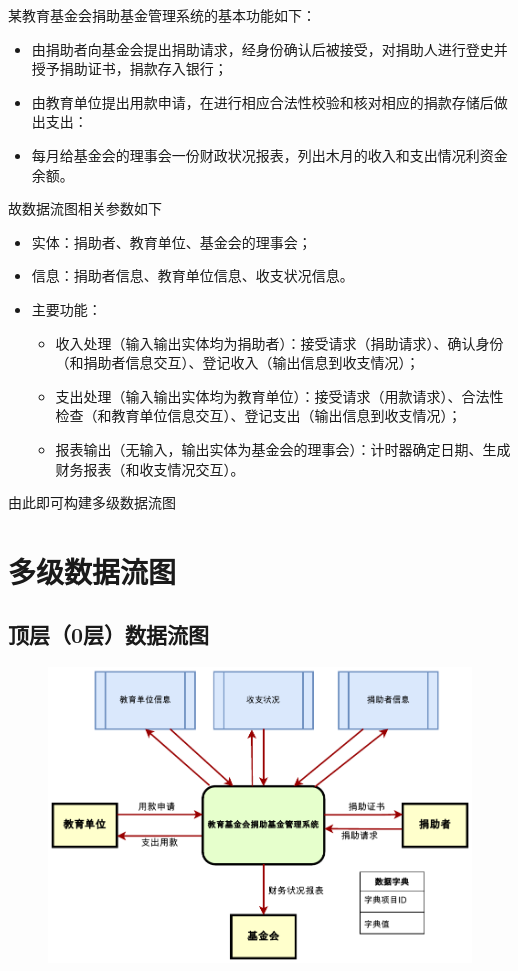 \documentclass[12pt, a4paper, oneside]{ctexart}
\begin{document}
某教育基金会捐助基金管理系统的基本功能如下：
\begin{itemize}
    \item 由捐助者向基金会提出捐助请求，经身份确认后被接受，对捐助人进行登史并授予捐助证书，捐款存入银行；
    \item 由教育单位提出用款申请，在进行相应合法性校验和核对相应的捐款存储后做出支出：
    \item 每月给基金会的理事会一份财政状况报表，列出木月的收入和支出情况利资金余额。
\end{itemize}

故数据流图相关参数如下
\begin{itemize}
    \item 实体：捐助者、教育单位、基金会的理事会；
    \item 信息：捐助者信息、教育单位信息、收支状况信息。
    \item 主要功能：
    \begin{itemize}
        \item 收入处理（输入输出实体均为捐助者）：接受请求（捐助请求）、确认身份（和捐助者信息交互）、登记收入（输出信息到收支情况）；
        \item 支出处理（输入输出实体均为教育单位）：接受请求（用款请求）、合法性检查（和教育单位信息交互）、登记支出（输出信息到收支情况）；
        \item 报表输出（无输入，输出实体为基金会的理事会）：计时器确定日期、生成财务报表（和收支情况交互）。
    \end{itemize}
\end{itemize}

由此即可构建多级数据流图

\section{多级数据流图}

\subsection{顶层（0层）数据流图}

\begin{figure}[H]
    \centering
    \includegraphics[width = 1\textwidth]{../pic/顶层.pdf}
\end{figure}
\end{document}
